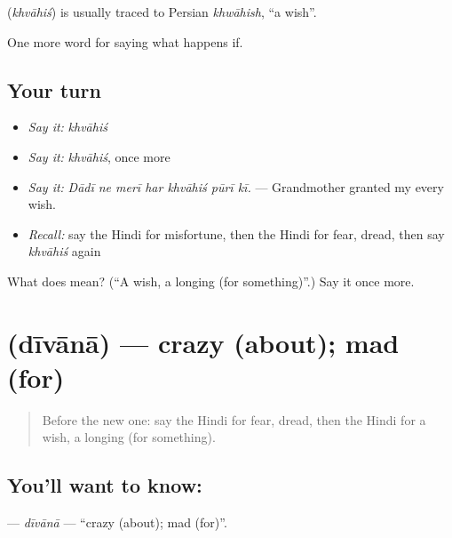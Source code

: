 \begin{cousinweb}
\textbf{} (\emph{khvāhiś}) is usually traced to Persian \emph{khwāhish}, \textquotedblleft{}a wish\textquotedblright{}.
\end{cousinweb}

\begin{grammarlens}[title={What you've built}]
One more word for saying what happens if.
\end{grammarlens}

\subsection*{Your turn}
\begin{itemize}
\raggedright
  \item \emph{Say it:} \emph{khvāhiś}
  \item \emph{Say it:} \emph{khvāhiś}, once more
  \item \emph{Say it:} \emph{Dādī ne merī har khvāhiś pūrī kī.} — Grandmother granted my every wish.
  \item \emph{Recall:} say the Hindi for misfortune, then the Hindi for fear, dread, then say \emph{khvāhiś} again
\end{itemize}

\begin{tcolorbox}[breakable,colback=teal!4,colframe=teal!35!black,title={Before you move on}]
What does  mean? (\textquotedblleft{}A wish, a longing (for something)\textquotedblright{}.) Say it once more.
\end{tcolorbox}
\section[\texorpdfstring{\hi{दीवाना} (dīvānā)}{दीवाना (dīvānā)}]{ (dīvānā) — crazy (about); mad (for)}

\label{lesson:HI-C558-divana}



\begin{quote}
Before the new one: say the Hindi for fear, dread, then the Hindi for a wish, a longing (for something).
\end{quote}

\subsection*{You'll want to know: }
\textbf{} — \emph{dīvānā} — \textquotedblleft{}crazy (about); mad (for)\textquotedblright{}.

